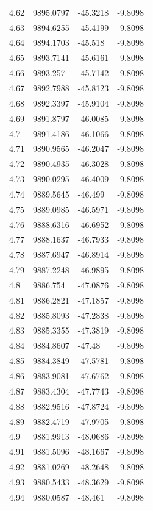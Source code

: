 \begin{table}[H]
\begin{tabular}{llll}
4.62 & 9895.0797 & -45.3218 & -9.8098 \\
4.63 & 9894.6255 & -45.4199 & -9.8098 \\
4.64 & 9894.1703 & -45.518 & -9.8098 \\
4.65 & 9893.7141 & -45.6161 & -9.8098 \\
4.66 & 9893.257 & -45.7142 & -9.8098 \\
4.67 & 9892.7988 & -45.8123 & -9.8098 \\
4.68 & 9892.3397 & -45.9104 & -9.8098 \\
4.69 & 9891.8797 & -46.0085 & -9.8098 \\
4.7 & 9891.4186 & -46.1066 & -9.8098 \\
4.71 & 9890.9565 & -46.2047 & -9.8098 \\
4.72 & 9890.4935 & -46.3028 & -9.8098 \\
4.73 & 9890.0295 & -46.4009 & -9.8098 \\
4.74 & 9889.5645 & -46.499 & -9.8098 \\
4.75 & 9889.0985 & -46.5971 & -9.8098 \\
4.76 & 9888.6316 & -46.6952 & -9.8098 \\
4.77 & 9888.1637 & -46.7933 & -9.8098 \\
4.78 & 9887.6947 & -46.8914 & -9.8098 \\
4.79 & 9887.2248 & -46.9895 & -9.8098 \\
4.8 & 9886.754 & -47.0876 & -9.8098 \\
4.81 & 9886.2821 & -47.1857 & -9.8098 \\
4.82 & 9885.8093 & -47.2838 & -9.8098 \\
4.83 & 9885.3355 & -47.3819 & -9.8098 \\
4.84 & 9884.8607 & -47.48 & -9.8098 \\
4.85 & 9884.3849 & -47.5781 & -9.8098 \\
4.86 & 9883.9081 & -47.6762 & -9.8098 \\
4.87 & 9883.4304 & -47.7743 & -9.8098 \\
4.88 & 9882.9516 & -47.8724 & -9.8098 \\
4.89 & 9882.4719 & -47.9705 & -9.8098 \\
4.9 & 9881.9913 & -48.0686 & -9.8098 \\
4.91 & 9881.5096 & -48.1667 & -9.8098 \\
4.92 & 9881.0269 & -48.2648 & -9.8098 \\
4.93 & 9880.5433 & -48.3629 & -9.8098 \\
4.94 & 9880.0587 & -48.461 & -9.8098 \\

\end{tabular}
\end{table}
